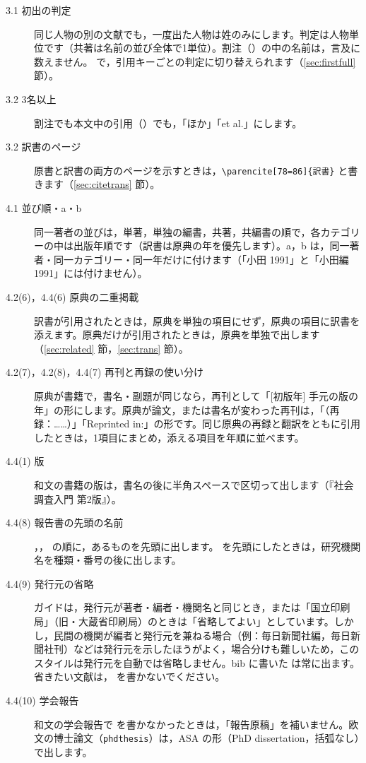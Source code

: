 \begin{description}
\item[3.1 初出の判定]
同じ人物の別の文献でも，一度出た人物は姓のみにします。判定は人物単位です（共著は名前の並び全体で1単位）。割注（）の中の名前は，言及に数えません。 で，引用キーごとの判定に切り替えられます（\ref{sec:firstfull} 節）。
\item[3.2 3名以上]
割注でも本文中の引用（）でも，「ほか」「et al.」にします。
\item[3.2 訳書のページ]
原書と訳書の両方のページを示すときは，\texttt{\textbackslash parencite[78=86]\{訳書\}} と書きます（\ref{sec:citetrans} 節）。
\item[4.1 並び順・a・b]
同一著者の並びは，単著，単独の編書，共著，共編書の順で，各カテゴリーの中は出版年順です（訳書は原典の年を優先します）。a，b は，同一著者・同一カテゴリー・同一年だけに付けます（「小田 1991」と「小田編 1991」には付けません）。
\item[4.2(6)，4.4(6) 原典の二重掲載]
訳書が引用されたときは，原典を単独の項目にせず，原典の項目に訳書を添えます。原典だけが引用されたときは，原典を単独で出します（\ref{sec:related} 節，\ref{sec:trans} 節）。
\item[4.2(7)，4.2(8)，4.4(7) 再刊と再録の使い分け]
原典が書籍で，書名・副題が同じなら，再刊として「[初版年] 手元の版の年」の形にします。原典が論文，または書名が変わった再刊は，「（再録：……）」「Reprinted in:」の形です。同じ原典の再録と翻訳をともに引用したときは，1項目にまとめ，添える項目を年順に並べます。
\item[4.4(1) 版]
和文の書籍の版は，書名の後に半角スペースで区切って出します（『社会調査入門 第2版』）。
\item[4.4(8) 報告書の先頭の名前]
，， の順に，あるものを先頭に出します。 を先頭にしたときは，研究機関名を種類・番号の後に出します。
\item[4.4(9) 発行元の省略]
ガイドは，発行元が著者・編者・機関名と同じとき，または「国立印刷局」（旧・大蔵省印刷局）のときは「省略してよい」としています。しかし，民間の機関が編者と発行元を兼ねる場合（例：毎日新聞社編，毎日新聞社刊）などは発行元を示したほうがよく，場合分けも難しいため，このスタイルは発行元を自動では省略しません。bib に書いた  は常に出ます。省きたい文献は， を書かないでください。
\item[4.4(10) 学会報告]
和文の学会報告で  を書かなかったときは，「報告原稿」を補いません。欧文の博士論文（\texttt{phdthesis}）は，ASA の形（PhD dissertation，括弧なし）で出します。

\end{description}
